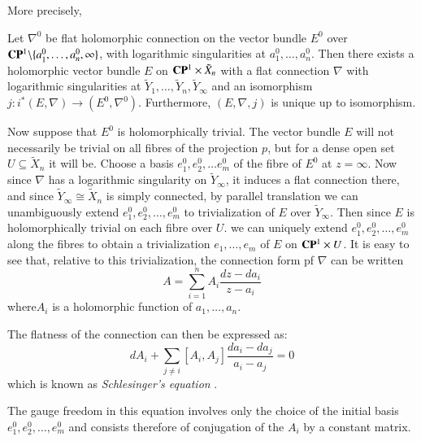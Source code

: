  More precisely,

\begin{thm}\label{chap7-thm-1}
 Let $\nabla^{0}$ be flat holomorphic connection on the vector bundle $E^{0}$ over $\mathbf{C}\mathbf{P}^{1}\backslash \{ a_{1}^{0}, \ldots, a_{n}^{0}, \infty\}$, with logarithmic singularities at $a_{1}^{0}, \ldots, a_{n}^{0}$. Then there exists a holomorphic vector bundle $E$ on $\mathbf{C} \mathbf{P}^{1} \times \tilde{X}_{n}$ with a flat connection $\nabla$ with logarithmic singularities at $\tilde{Y}_{1}, \ldots,\tilde{Y}_{n}, \tilde{Y}_{\infty}$ and an isomorphism $j : i^{*} (E, \nabla) \rightarrow (E^{0}, \nabla^{0})$. Furthermore, $(E, \nabla, j)$ is unique up to isomorphism.
\end{thm}

 Now suppose that $E^{0}$ is holomorphically trivial. The vector bundle $E$ will not necessarily be trivial on all fibres of the projection $p$, but for a dense open set $U \subseteq \tilde{X}_{n}$ it will be. Choose a basis $e_{1}^{0}, e_{2}^{0}, \ldots e_{m}^{0}$ of the fibre of $E^{0}$ at $z = \infty$. Now since $\nabla$ has a logarithmic singularity on $\tilde{Y}_{\infty}$, it induces a flat connection there, and since $\tilde{Y}_{\infty} \cong \tilde{X}_{n}$ is simply connected, by parallel translation we can unambiguously extend $e_{1}^{0}, e_{2}^{0}, \ldots, e_{m}^{0}$ to trivialization of $E$ over $\tilde{Y}_{\infty}$. Then since $E$ is holomorphically trivial on each fibre over $U$. we can uniquely extend $e_{1}^{0}, e_{2}^{0}, \ldots, e_{m}^{0}$ along the fibres to obtain a trivialization $e_{1}, \ldots, e_{m}$ of $E$ on $\mathbf{C}\mathbf{P}^{1} \times U$. It is easy to see that, relative to this trivialization, the connection form pf $\nabla$ can be written
\begin{equation*}\label{chap7-eq-2}
A = \sum\limits_{i=1}^{n}A_{i} \dfrac{dz-da_{i}}{z-a_{i}}\tag{2}
\end{equation*}
where\pageoriginale $A_{i}$ is a holomorphic function of $a_{1}, \ldots, a_{n}$.

The flatness of the connection can then be expressed as:
$$
dA_{i} + \sum\limits_{j\neq i}[A_{i}, A_{j}]\dfrac{da_{i}-da_{j}}{a_{i}-a_{j}} =0
$$
which is known as \textit{Schlesinger's equation} \cite{chap7-key15}.

The gauge freedom in this equation involves only the choice of the initial basis $e_{1}^{0}, e_{2}^{0}, \ldots, e_{m}^{0}$ and consists therefore of conjugation of the $A_{i}$ by a constant matrix.

